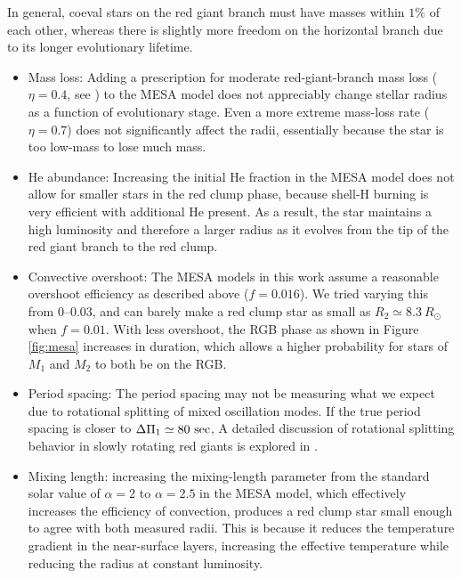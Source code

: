 In general, coeval stars on the red giant branch must have masses within $1\%$ of each other, whereas there is slightly more freedom on the horizontal branch due to its longer evolutionary lifetime. 
\begin{itemize}
\item Mass loss: Adding a prescription for moderate red-giant-branch mass loss ($\eta = 0.4$, see \citealt{mig12}) to the MESA model does not appreciably change stellar radius as a function of evolutionary stage. Even a more extreme mass-loss rate ($\eta = 0.7$) does not significantly affect the radii, essentially because the star is too low-mass to lose much mass.
\item He abundance: Increasing the initial He fraction in the MESA model does not allow for smaller stars in the red clump phase, because shell-H burning is very efficient with additional He present. As a result, the star maintains a high luminosity and therefore a larger radius as it evolves from the tip of the red giant branch to the red clump.
\item Convective overshoot: The MESA models in this work assume a reasonable overshoot efficiency as described above ($f = 0.016$). We tried varying this from 0--0.03, and can barely make a red clump star as small as $R_2 \simeq 8.3 \ R_\odot$ when $f = 0.01$. With less overshoot, the RGB phase as shown in Figure \ref{fig:mesa} increases in duration, which allows a higher probability for stars of $M_1$ and $M_2$ to both be on the RGB.
\item Period spacing: The period spacing  may not be measuring what we expect due to rotational splitting of mixed oscillation modes. If the true period spacing is closer to $\Delta \Pi_1 \simeq 80 \ \rm{sec}$,  A detailed discussion of rotational splitting behavior in slowly rotating red giants is explored in \citet{gou13}.
\item Mixing length:  increasing the mixing-length parameter from the standard solar value of $\alpha = 2$ to $\alpha = 2.5$ in the MESA model, which effectively increases the efficiency of convection, produces a red clump star small enough to agree with both measured radii. This is because it reduces the temperature gradient in the near-surface layers, increasing the effective temperature while reducing the radius at constant luminosity. 
\end{itemize}
